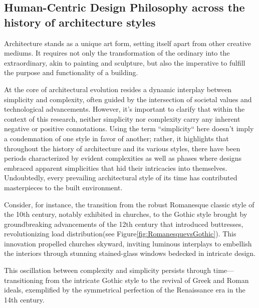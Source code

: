 \subsection{Human-Centric Design Philosophy across the history of architecture styles}
\label{subsec:TimelineArchitectureStyles}



Architecture stands as a unique art form, setting itself apart from other creative mediums.
It requires not only the transformation of the ordinary into the extraordinary, akin to painting and sculpture, but also the imperative to fulfill the purpose and functionality of a building\cite{Hnin2022}.

At the core of architectural evolution resides a dynamic interplay between simplicity and complexity, often guided by the intersection of societal values and technological advancements\cite{Economakis2023}.
However, it's important to clarify that within the context of this research, neither simplicity nor complexity carry any inherent negative or positive connotations.
Using the term ``simplicity`` here doesn't imply a condemnation of one style in favor of another;
rather, it highlights that throughout the history of architecture and its various styles, there have been periods characterized by evident complexities as well as phases where designs embraced apparent simplicities that hid their intricacies into themselves.
Undoubtedly, every prevailing architectural style of its time has contributed masterpieces to the built environment.

Consider, for instance, the transition from the robust Romanesque classic style of the 10th century, notably exhibited in churches, to the Gothic style brought by groundbreaking advancements of the 12th century that introduced buttresses, revolutionizing load distribution\cite{Arora2023}(see Figure\ref{fig:RomanesquevsGothic}).
This innovation propelled churches skyward, inviting luminous interplays to embellish the interiors through stunning stained-glass windows bedecked in intricate design\cite{Stacbond2020}.

This oscillation between complexity and simplicity persists through time— transitioning from the intricate Gothic style to the revival of Greek and Roman ideals, exemplified by the symmetrical perfection of the Renaissance era in the 14th century.

